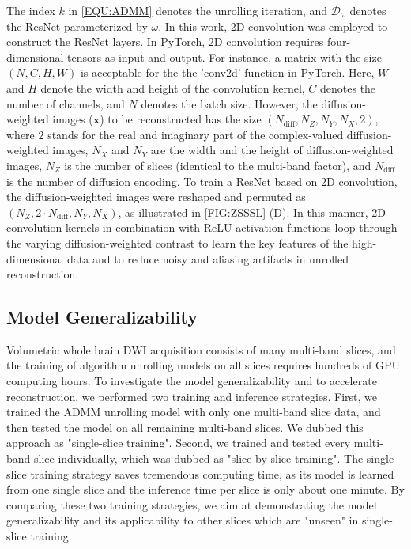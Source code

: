 \documentclass[AMA,STIX2COL,Linenumberson]{MRM}
\begin{document}
The index $k$ in \cref{EQU:ADMM} denotes the unrolling iteration,
and $\mathcal{D}_{\omega}$ denotes the ResNet \cite{he_2016_resnet}
parameterized by $\omega$.
In this work, 2D convolution was employed to construct the ResNet layers.
In PyTorch, 2D convolution requires four-dimensional tensors as input and output.
For instance, a matrix with the size $(N, C, H, W)$ is acceptable
for the the 'conv2d' function in PyTorch.
Here, $W$ and $H$ denote the width and height of the convolution kernel,
$C$ denotes the number of channels, and $N$ denotes the batch size.
However, the diffusion-weighted images ($\mathbf{x}$) to be reconstructed
has the size $(N_{\text{diff}}, N_Z, N_Y, N_X, 2)$,
where $2$ stands for the real and imaginary part
of the complex-valued diffusion-weighted images,
$N_X$ and $N_Y$ are the width and the height of diffusion-weighted images,
$N_Z$ is the number of slices (identical to the multi-band factor), and
$N_{\text{diff}}$ is the number of diffusion encoding.
To train a ResNet based on 2D convolution,
the diffusion-weighted images were reshaped and permuted
as $(N_Z, 2 \cdot N_{\text{diff}}, N_Y, N_X)$, as illustrated in \cref{FIG:ZSSSL} (D).
In this manner, 2D convolution kernels in combination with ReLU activation functions
loop through the varying diffusion-weighted contrast
to learn the key features of the high-dimensional data and
to reduce noisy and aliasing artifacts in unrolled reconstruction.

\subsection{Model Generalizability} \label{SEC:ZSSSL_GEN}

Volumetric whole brain DWI acquisition consists of many multi-band slices,
and the training of algorithm unrolling models on all slices requires
hundreds of GPU computing hours.
To investigate the model generalizability and to accelerate reconstruction,
we performed two training and inference strategies.
First, we trained the ADMM unrolling model with only one multi-band slice data,
and then tested the model on all remaining multi-band slices.
We dubbed this approach as "single-slice training".
Second, we trained and tested every multi-band slice individually,
which was dubbed as "slice-by-slice training".
The single-slice training strategy saves tremendous computing time,
as its model is learned from one single slice and
the inference time per slice is only about one minute.
By comparing these two training strategies,
we aim at demonstrating the model generalizability and
its applicability to other slices which are "unseen" in single-slice training.
\end{document}

